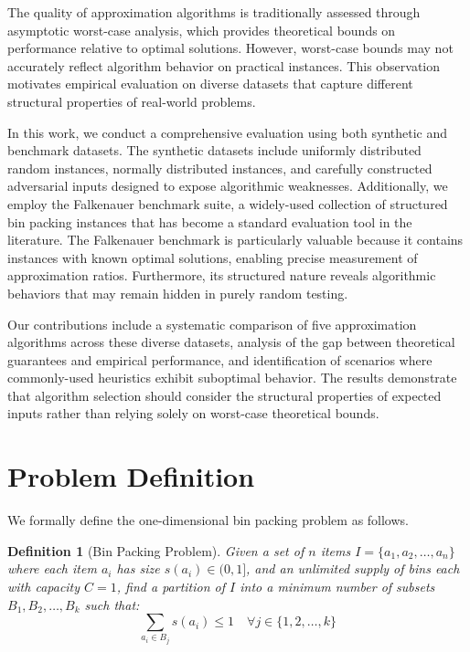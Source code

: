\documentclass[11pt,a4paper]{article}
\newtheorem{definition}{Definition}
\begin{document}
The quality of approximation algorithms is traditionally assessed through asymptotic worst-case analysis, which provides theoretical bounds on performance relative to optimal solutions. However, worst-case bounds may not accurately reflect algorithm behavior on practical instances. This observation motivates empirical evaluation on diverse datasets that capture different structural properties of real-world problems.

In this work, we conduct a comprehensive evaluation using both synthetic and benchmark datasets. The synthetic datasets include uniformly distributed random instances, normally distributed instances, and carefully constructed adversarial inputs designed to expose algorithmic weaknesses. Additionally, we employ the Falkenauer benchmark suite, a widely-used collection of structured bin packing instances that has become a standard evaluation tool in the literature. The Falkenauer benchmark is particularly valuable because it contains instances with known optimal solutions, enabling precise measurement of approximation ratios. Furthermore, its structured nature reveals algorithmic behaviors that may remain hidden in purely random testing.

Our contributions include a systematic comparison of five approximation algorithms across these diverse datasets, analysis of the gap between theoretical guarantees and empirical performance, and identification of scenarios where commonly-used heuristics exhibit suboptimal behavior. The results demonstrate that algorithm selection should consider the structural properties of expected inputs rather than relying solely on worst-case theoretical bounds.

\section{Problem Definition}

We formally define the one-dimensional bin packing problem as follows.

\begin{definition}[Bin Packing Problem]
Given a set of $n$ items $I = \{a_1, a_2, \ldots, a_n\}$ where each item $a_i$ has size $s(a_i) \in (0, 1]$, and an unlimited supply of bins each with capacity $C = 1$, find a partition of $I$ into a minimum number of subsets $B_1, B_2, \ldots, B_k$ such that:
\begin{equation}
\sum_{a_i \in B_j} s(a_i) \leq 1 \quad \forall j \in \{1, 2, \ldots, k\}
\end{equation}
\end{definition}
\end{document}
